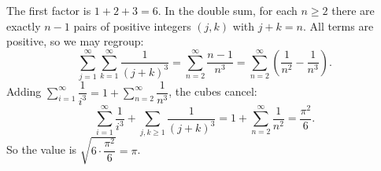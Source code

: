 The first factor is $1+2+3=6$. In the double sum, for each $n\ge2$ there are exactly $n-1$ pairs of positive integers $(j,k)$ with $j+k=n$. All terms are positive, so we may regroup:
\[\sum_{j=1}^{\infty}\sum_{k=1}^{\infty}\dfrac{1}{(j+k)^3}=\sum_{n=2}^{\infty}\dfrac{n-1}{n^3}=\sum_{n=2}^{\infty}\left(\dfrac1{n^2}-\dfrac1{n^3}\right).\]
Adding $\displaystyle\sum_{i=1}^{\infty}\dfrac1{i^3}=1+\sum_{n=2}^{\infty}\dfrac1{n^3}$, the cubes cancel:
\[\sum_{i=1}^{\infty}\dfrac1{i^3}+\sum_{j,k\ge1}\dfrac{1}{(j+k)^3}=1+\sum_{n=2}^{\infty}\dfrac1{n^2}=\dfrac{\pi^2}6.\]
So the value is $\sqrt{6\cdot\dfrac{\pi^2}{6}}=\boxed{\pi}$.
